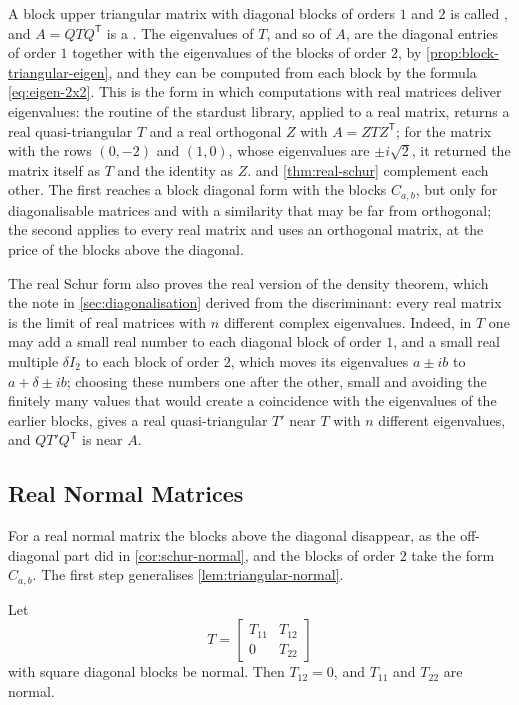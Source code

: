 A block upper triangular matrix with diagonal blocks of orders $1$ and $2$ is called , and $A=QTQ^{\mathsf T}$ is a . The eigenvalues of $T$, and so of $A$, are the diagonal entries of order $1$ together with the eigenvalues of the blocks of order $2$, by \cref{prop:block-triangular-eigen}, and they can be computed from each block by the formula \eqref{eq:eigen-2x2}. This is the form in which computations with real matrices deliver eigenvalues: the routine  of the stardust library, applied to a real matrix, returns a real quasi-triangular $T$ and a real orthogonal $Z$ with $A=ZTZ^{\mathsf T}$; for the matrix with the rows $(0,-2)$ and $(1,0)$, whose eigenvalues are $\pm i\sqrt2$, it returned the matrix itself as $T$ and the identity as $Z$.  and \cref{thm:real-schur} complement each other. The first reaches a block diagonal form with the blocks $C_{a,b}$, but only for diagonalisable matrices and with a similarity that may be far from orthogonal; the second applies to every real matrix and uses an orthogonal matrix, at the price of the blocks above the diagonal.

The real Schur form also proves the real version of the density theorem, which the note in \cref{sec:diagonalisation} derived from the discriminant: every real matrix is the limit of real matrices with $n$ different complex eigenvalues. Indeed, in $T$ one may add a small real number to each diagonal block of order $1$, and a small real multiple $\delta I_2$ to each block of order $2$, which moves its eigenvalues $a\pm ib$ to $a+\delta\pm ib$; choosing these numbers one after the other, small and avoiding the finitely many values that would create a coincidence with the eigenvalues of the earlier blocks, gives a real quasi-triangular $T'$ near $T$ with $n$ different eigenvalues, and $QT'Q^{\mathsf T}$ is near $A$.

\subsection{Real Normal Matrices}

For a real normal matrix the blocks above the diagonal disappear, as the off-diagonal part did in \cref{cor:schur-normal}, and the blocks of order $2$ take the form $C_{a,b}$. The first step generalises \cref{lem:triangular-normal}.

\begin{lemma}
\label{lem:block-triangular-normal}
Let
\[
T=\begin{bmatrix}T_{11}&T_{12}\\0&T_{22}\end{bmatrix}
\]
with square diagonal blocks be normal. Then $T_{12}=0$, and $T_{11}$ and $T_{22}$ are normal.
\end{lemma}

